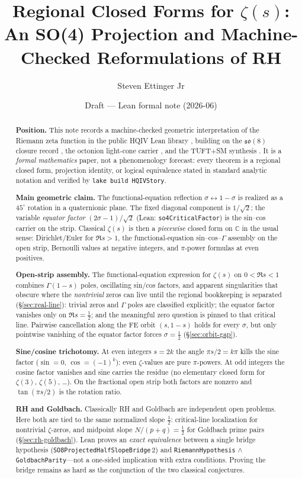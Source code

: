 \documentclass[11pt]{amsart}
\title[Regional $\zeta(s)$ and SO(4) projection]
{Regional Closed Forms for $\zeta(s)$:\\
An SO(4) Projection and Machine-Checked Reformulations of RH}
\author{Steven Ettinger Jr}
\date{Draft --- Lean formal note (2026-06)}
\begin{document}
\begin{abstract}
\noindent\textbf{Position.}
This note records a machine-checked geometric interpretation of the Riemann zeta
function in the public HQIV Lean library \cite{hqiv-lean}, building on the
$\mathfrak{so}(8)$ closure record \cite{hqiv-so8-paper}, the octonion
light-cone carrier \cite{hqiv-lightcone-paper}, and the TUFT+SM synthesis
\cite{hqiv-tuft-sm-lagrangian-paper}.  It is a \emph{formal mathematics} paper,
not a phenomenology forecast: every theorem is a regional closed form,
projection identity, or logical equivalence stated in standard analytic
notation and verified by \texttt{lake build HQIVStory}.

\noindent\textbf{Main geometric claim.}
The functional-equation reflection $\sigma\leftrightarrow 1-\sigma$ is realized
as a $45^\circ$ rotation in a quaternionic plane.  The fixed diagonal component
is $1/\sqrt2$; the variable \emph{equator factor} $(2\sigma-1)/\sqrt2$
(Lean: \texttt{so4CriticalFactor}) is the sin--cos carrier on the strip.
Classical $\zeta(s)$ is then a \emph{piecewise} closed form on $\mathbb{C}$ in
the usual sense: Dirichlet/Euler for $\Re s>1$, the functional-equation
sin--cos--$\Gamma$ assembly on the open strip, Bernoulli values at negative
integers, and $\pi$-power formulas at even positives.

\noindent\textbf{Open-strip assembly.}
The functional-equation expression for $\zeta(s)$ on $0<\Re s<1$ combines
$\Gamma(1-s)$ poles, oscillating sin/cos factors, and apparent singularities
that obscure where the \emph{nontrivial} zeros can live until the regional
bookkeeping is separated (\S\ref{sec:real-line}): trivial zeros and $\Gamma$
poles are classified explicitly; the equator factor vanishes only on
$\Re s=\tfrac12$; and the meaningful zero question is pinned to that critical
line.  Pairwise cancellation along the FE orbit $(s,1-s)$ holds for every
$\sigma$, but only pointwise vanishing of the equator factor forces
$\sigma=\tfrac12$ (\S\ref{sec:orbit-gap}).

\noindent\textbf{Sine/cosine trichotomy.}
At even integers $s=2k$ the angle $\pi s/2=k\pi$ kills the sine factor
($\sin=0$, $\cos=(-1)^k$): even $\zeta$-values are pure $\pi$-powers.
At odd integers the cosine factor vanishes and sine carries the residue (no
elementary closed form for $\zeta(3)$, $\zeta(5)$, \ldots).
On the fractional open strip both factors are nonzero and
$\tan(\pi s/2)$ is the rotation ratio.

\noindent\textbf{RH and Goldbach.}
Classically RH and Goldbach are independent open problems.  Here both are tied
to the same normalized slope $\tfrac12$: critical-line localization for
nontrivial $\zeta$-zeros, and midpoint slope $N/(p+q)=\tfrac12$ for Goldbach
prime pairs (\S\ref{sec:rh-goldbach}).  Lean proves an \emph{exact equivalence}
between a single bridge hypothesis (\texttt{SO8ProjectedHalfSlopeBridge}\,$2$)
and \texttt{RiemannHypothesis} $\wedge$ \texttt{GoldbachParity}---not a
one-sided implication with extra conditions.  Proving the bridge remains as hard
as the conjunction of the two classical conjectures.


\end{abstract}
\end{document}
